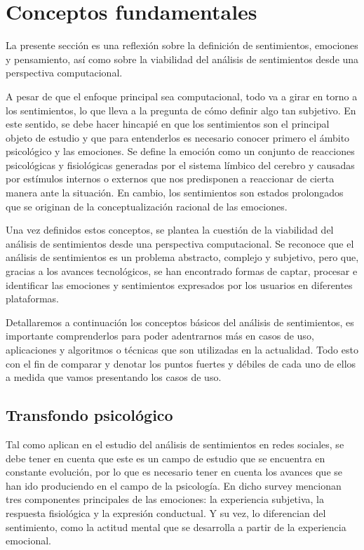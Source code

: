 \documentclass[conference]{IEEEtran}
\begin{document}
\section{Conceptos fundamentales}
La presente sección es una reflexión sobre la definición de sentimientos, emociones y pensamiento, así como sobre la viabilidad del análisis de sentimientos desde una perspectiva computacional.

A pesar de que el enfoque principal sea computacional, todo va a girar en torno a los sentimientos, lo que lleva a la pregunta de cómo definir algo tan subjetivo. 
En este sentido, se debe hacer hincapié en que los sentimientos son el principal objeto de estudio y que para entenderlos es necesario conocer primero el ámbito psicológico y las emociones. 
Se define la emoción como un conjunto de reacciones psicológicas y fisiológicas generadas por el sistema límbico del cerebro y causadas por estímulos internos o externos que nos predisponen a reaccionar de cierta manera ante la situación. 
En cambio, los sentimientos son estados prolongados que se originan de la conceptualización racional de las emociones.

Una vez definidos estos conceptos, se plantea la cuestión de la viabilidad del análisis de sentimientos desde una perspectiva computacional. 
Se reconoce que el análisis de sentimientos es un problema abstracto, complejo y subjetivo, pero que, gracias a los avances tecnológicos, se han encontrado formas de captar, procesar e identificar las emociones y sentimientos expresados por los usuarios en diferentes plataformas. 

Detallaremos a continuación los conceptos básicos del análisis de sentimientos, es importante comprenderlos para poder adentrarnos más en casos de uso, aplicaciones y algoritmos o técnicas que son utilizadas en la actualidad. Todo esto con el fin de comparar y denotar los puntos fuertes y débiles de cada uno de ellos a medida que vamos presentando los casos de uso.

\subsection{Transfondo psicológico}
Tal como aplican en el estudio \cite{b1} del análisis de sentimientos en redes sociales, se debe tener en cuenta que este es un campo de estudio que se encuentra en constante evolución, por lo que es necesario tener en cuenta los avances que se han ido produciendo en el campo de la psicología. En dicho survey mencionan tres componentes principales de las emociones: la experiencia subjetiva, la respuesta fisiológica y la expresión conductual. Y su vez, lo diferencian del sentimiento, como la actitud mental que se desarrolla a partir de la experiencia emocional.
\end{document}
